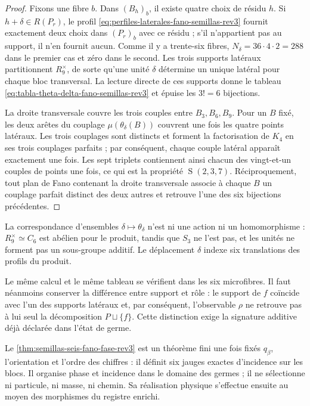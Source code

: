 \begin{proof}
Fixons une fibre \(b\). Dans \((B_h)_b\), il existe quatre choix de
résidu \(h\). Si \(h+\delta\in R(P_r)\), le profil
\eqref{eq:perfiles-laterales-fano-semillas-rev3} fournit exactement deux
choix dans \((P_r)_b\) avec ce résidu ; s'il n'appartient pas au support, il
n'en fournit aucun. Comme il y a trente-six fibres,
\(N_\delta=36\cdot4\cdot2=288\) dans le premier cas et zéro dans le second.
Les trois supports latéraux partitionnent \(R_9^\times\), de sorte qu'une unité
\(\delta\) détermine un unique latéral pour chaque bloc transversal. La lecture
directe de ces supports donne le tableau
\eqref{eq:tabla-theta-delta-fano-semillas-rev3} et épuise les \(3!=6\)
bijections.

La droite transversale couvre les trois couples entre \(B_3,B_6,B_9\). Pour un
\(B\) fixé, les deux arêtes du couplage \(\mu(\theta_\delta(B))\)
couvrent une fois les quatre points latéraux. Les trois couplages sont
distincts et forment la factorisation de \(K_4\) en ses trois couplages
parfaits ; par conséquent, chaque
couple latéral apparaît exactement une fois. Les sept triplets contiennent ainsi
chacun des vingt-et-un couples de points une fois, ce qui est la propriété
\(\operatorname{S}(2,3,7)\). Réciproquement, tout plan de Fano contenant
la droite transversale associe à chaque \(B\) un couplage parfait distinct
des deux autres et retrouve l'une des six bijections précédentes.
\end{proof}

La correspondance d'ensembles \(\delta\mapsto\theta_\delta\) n'est ni une
action ni un homomorphisme : \(R_9^\times\simeq C_6\) est abélien pour le
produit, tandis que \(S_3\) ne l'est pas, et les unités ne forment pas un sous-groupe
additif. Le déplacement \(\delta\) indexe six translations des profils
du produit.

Le même calcul et le même tableau se vérifient dans les six microfibres. Il faut
néanmoins conserver la différence entre support et rôle : le support de
\(f\) coïncide avec l'un des supports latéraux et, par conséquent, l'observable
\(\rho\) ne retrouve pas à lui seul la décomposition \(P\sqcup\{f\}\). Cette
distinction exige la signature additive déjà déclarée dans l'état de germe.

\begin{statusbox}[title={Statut et portée de l'incidence de Fano}]
Le \cref{thm:semillas-seis-fano-fase-rev3} est un théorème fini une fois
fixés \(q_\beta\), l'orientation et l'ordre des chiffres : il définit six jauges
exactes d'incidence sur les blocs. Il organise phase et incidence dans le domaine
des germes ; il ne sélectionne ni particule, ni masse, ni chemin. Sa réalisation physique
s'effectue ensuite au moyen des morphismes du registre enrichi.
\end{statusbox}

